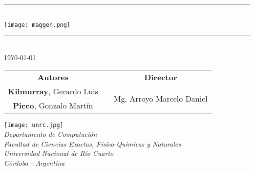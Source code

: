 \newcommand{\HRule}{\rule{\linewidth}{0.6mm}}
\begin{titlepage}

\begin{center}


\vspace*{2cm}

  {\Large{\textbf{}}}
\vspace*{0.3cm}
\HRule \\
  \vspace*{0.6cm}
{\centering \texttt{[image: maggen.png]}}

\HRule \\[0.5cm]
\vspace*{1.5cm}
\today

\vspace*{2.2cm}
\begin{tabular}{cp{2.5cm}c}
\large
\textbf{Autores} & & \textbf{Director}\\ 
\textbf{Kilmurray}, Gerardo Luis & & \multirow{2}{*}{Mg. Arroyo Marcelo Daniel}\\
\textbf{Picco}, Gonzalo Martín & & \\


\end{tabular}

\vspace*{3.2cm}
 \texttt{[image: unrc.jpg]}\\
\vspace*{0.4cm}
\normalsize{\textit{Departamento de Computación\\
                    Facultad de Ciencias Exactas, Físico-Químicas y Naturales\\
                    Universidad Nacional de Río Cuarto\\
                    Córdoba - Argentina}}
\end{center}
\end{titlepage}
\sloppy

\titlepage
